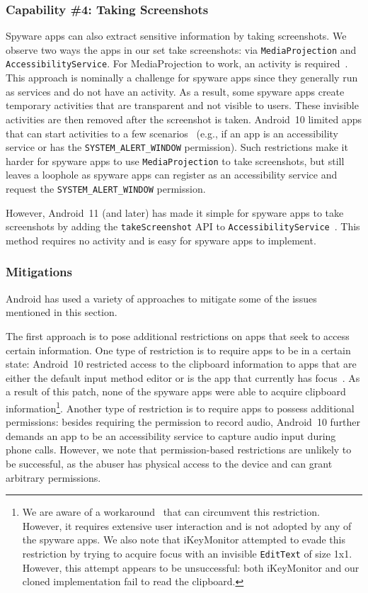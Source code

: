 \subsubsection*{Capability \#4: Taking Screenshots}
\label{subsubsec:screenshot}
Spyware apps can also extract sensitive information by taking screenshots. We
observe two ways the apps in our set take screenshots: via
\texttt{MediaProjection} and \texttt{AccessibilityService}. For MediaProjection
to work, an activity is required~\cite{androidH20:online}. This approach is
nominally a challenge for spyware apps since they generally run as services and
do not have an activity. As a result, some spyware apps create temporary
activities that are transparent and not visible to users. These invisible
activities are then removed after the screenshot is taken.  Android~10 limited
apps that can start activities to a few scenarios~\cite{Restrict50:online}
(e.g., if an app is an accessibility service or has the \texttt{SYSTEM\_ALERT\_WINDOW}
permission). Such restrictions make it harder for spyware apps to use
\texttt{MediaProjection} to take screenshots, but still leaves a loophole as spyware apps
can register as an accessibility service and request the \texttt{SYSTEM\_ALERT\_WINDOW}
permission.

However, Android~11 (and later) has made it
simple for spyware apps to take screenshots by adding the
\texttt{takeScreenshot} API to \texttt{AccessibilityService}~\cite{Accessib97:online}.
This method requires no activity and is easy for spyware apps to implement.


\subsubsection{Mitigations}
Android has used a variety of approaches to mitigate some of the issues mentioned in this section.

The first approach is to pose additional restrictions on apps that seek to access certain information. One type of restriction is to require apps to be in a certain state: Android~10 restricted access to the clipboard information
to apps that are either the default input
method editor or is the app that currently has focus~\cite{Privacyc52:online}. As a result of this
patch, none of the spyware apps were able to acquire clipboard information\footnote{We are aware of a workaround~\cite{SolvedCl34:online} that can circumvent this restriction. However, it requires extensive user interaction and is not adopted by any of the spyware apps. We also note
that iKeyMonitor
attempted to evade this restriction by trying to acquire focus with an
invisible \texttt{EditText} of size 1x1. However, this attempt appears to be
unsuccessful: both iKeyMonitor and our cloned implementation fail to
read the clipboard.}. Another type of restriction is to require apps to possess additional permissions: besides requiring the permission to record audio, Android~10 further demands an app to be an accessibility service to capture audio input during phone calls. However, we note that permission-based restrictions are unlikely to be successful, as the abuser has physical access to the device and can grant arbitrary permissions.

